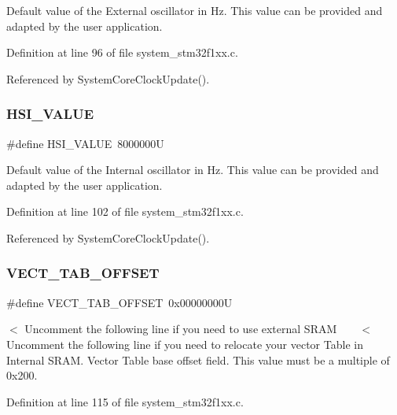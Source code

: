 Default value of the External oscillator in Hz. This value can be provided and adapted by the user application. 

Definition at line 96 of file system\+\_\+stm32f1xx.\+c.



Referenced by System\+Core\+Clock\+Update().

\mbox{\label{group__STM32F1xx__System__Private__Defines_gaaa8c76e274d0f6dd2cefb5d0b17fbc37}} 
\subsubsection{\texorpdfstring{H\+S\+I\+\_\+\+V\+A\+L\+UE}{HSI\_VALUE}}
{\footnotesize\ttfamily \#define H\+S\+I\+\_\+\+V\+A\+L\+UE~8000000U}

Default value of the Internal oscillator in Hz. This value can be provided and adapted by the user application. 

Definition at line 102 of file system\+\_\+stm32f1xx.\+c.



Referenced by System\+Core\+Clock\+Update().

\mbox{\label{group__STM32F1xx__System__Private__Defines_ga40e1495541cbb4acbe3f1819bd87a9fe}} 
\subsubsection{\texorpdfstring{V\+E\+C\+T\+\_\+\+T\+A\+B\+\_\+\+O\+F\+F\+S\+ET}{VECT\_TAB\_OFFSET}}
{\footnotesize\ttfamily \#define V\+E\+C\+T\+\_\+\+T\+A\+B\+\_\+\+O\+F\+F\+S\+ET~0x00000000U}

$<$ Uncomment the following line if you need to use external S\+R\+AM ~\newline
~\newline
 $<$ Uncomment the following line if you need to relocate your vector Table in Internal S\+R\+AM. Vector Table base offset field. This value must be a multiple of 0x200. 

Definition at line 115 of file system\+\_\+stm32f1xx.\+c.

